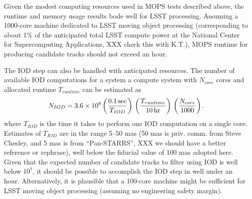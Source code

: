 Given the modest computing resources used in MOPS tests described above, the runtime and memory
usage results bode well for LSST processing. Assuming a 1000-core machine dedicated to LSST moving
object processing (corresponding to about 1\% of the anticipated total LSST compute power at the
National Center for Supercomputing Applications, XXX check this with K.T.), MOPS runtime for
producing candidate tracks should not exceed an hour.

The IOD step can also be handled with anticipated resources. The number of available IOD computations
for a system a compute system with $N_{core}$ cores and allocated runtime $T_{runtime}$ can be estimated
as
\begin{equation}
  N_{IOD} = 3.6\times10^8 \left({ 0.1\,{\rm sec} \over T_{IOD}}\right) \,
                                         \left({ T_{runtime}  \over 10\,{\rm hr} }\right) \,
                                         \left({ N_{core}  \over 1000}\right).
\end{equation}
where $T_{IOD}$ is the time it takes to perform one IOD computation on a single core. Estimates
of $T_{IOD}$ are in the range 5--50 mas (50 mas is priv. comm. from Steve Chesley, and 5 mas is
from ``Pan-STARRS'', XXX we should have a better reference or rephrase), well below the fiducial
value of 100 mas adopted here. Given that the expected number of candidate tracks to filter using
IOD is well below $10^7$, it should be possible to accomplish the IOD step in well under an hour.
Alternatively, it is plausible that a 100-core machine might be sufficient for LSST moving object
processing (assuming no engineering safety margin).
